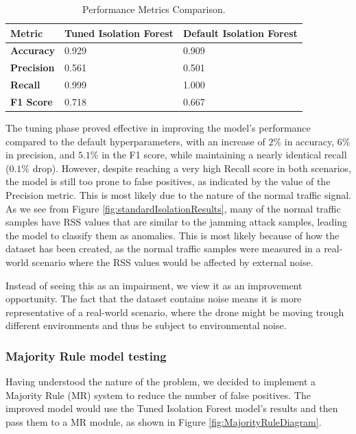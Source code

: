 \documentclass[futureinternet,article,submit,pdftex,moreauthors]{Definitions/mdpi}
\begin{document}
\begin{table}[H]
    \caption{Performance Metrics Comparison.}\label{tab:performanceMetrics}
    \begin{tabularx}{\textwidth}{CCC}
    \toprule
    \textbf{Metric} & \textbf{Tuned Isolation Forest} & \textbf{Default Isolation Forest} \\
    \midrule
    \textbf{Accuracy} & 0.929 & 0.909 \\
    \textbf{Precision} & 0.561 & 0.501 \\
    \textbf{Recall} & 0.999 & 1.000 \\
    \textbf{F1 Score} & 0.718 & 0.667 \\
    \bottomrule
    \end{tabularx}
\end{table}


The tuning phase proved effective in improving the model's performance compared to the default hyperparameters, with an increase of $2\%$ in accuracy, $6\%$ in precision, and $5.1\%$ in the F1 score, while maintaining a nearly identical recall ($0.1\%$ drop). However, despite reaching a very high Recall score in both scenarios, the model is still too prone to false positives, as indicated by the value of the Precision metric. 
This is most likely due to the nature of the normal traffic signal. As we see from Figure \ref{fig:standardIsolationResults}, many of the normal traffic samples have RSS values that are similar to the jamming attack samples, leading the model to classify them as anomalies.
This is most likely because of how the dataset has been created, as the normal traffic samples were measured in a real-world scenario where the RSS values would be affected by external noise. 

Instead of seeing this as an impairment, we view it as an improvement opportunity. The fact that the dataset contains noise means it is more representative of a real-world scenario, where the drone might be moving trough different environments and thus be subject to environmental noise.

\subsubsection{Majority Rule model testing} \label{sec:majorityRuleModelTesting}

Having understood the nature of the problem, we decided to implement a Majority Rule (MR) system to reduce the number of false positives. The improved model would use the Tuned Isolation Forest model's results and then pass them to a MR module, as shown in Figure \ref{fig:MajorityRuleDiagram}. 
\end{document}
